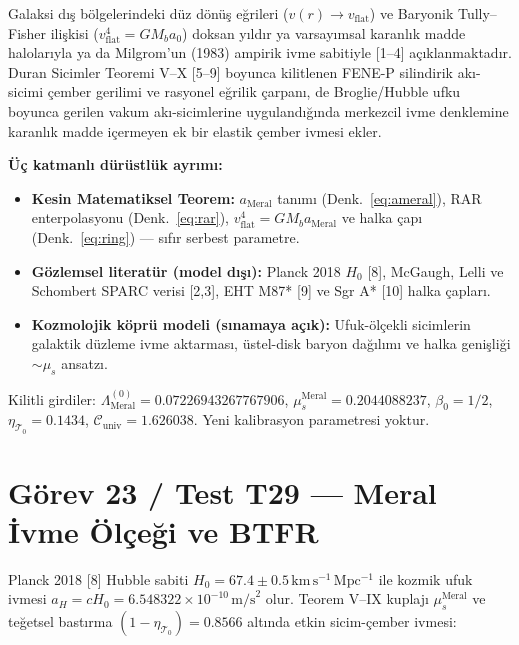 \documentclass[12pt,a4paper]{article}
\begin{document}
Galaksi dış bölgelerindeki düz dönüş eğrileri ($v(r)\to v_{\mathrm{flat}}$) ve
Baryonik Tully--Fisher ilişkisi ($v_{\mathrm{flat}}^4 = GM_b a_0$) doksan yıldır
ya varsayımsal karanlık madde halolarıyla ya da Milgrom'un (1983) ampirik ivme
sabitiyle [1--4] açıklanmaktadır. Duran Sicimler Teoremi V--X [5--9] boyunca
kilitlenen FENE-P silindirik akı-sicimi çember gerilimi ve rasyonel eğrilik
çarpanı, de Broglie/Hubble ufku boyunca gerilen vakum akı-sicimlerine
uygulandığında merkezcil ivme denklemine karanlık madde içermeyen ek bir elastik
çember ivmesi ekler.

\textbf{Üç katmanlı dürüstlük ayrımı:}
\begin{itemize}
    \item \textbf{Kesin Matematiksel Teorem:} $a_{\mathrm{Meral}}$ tanımı
    (Denk.~\ref{eq:ameral}), RAR enterpolasyonu (Denk.~\ref{eq:rar}),
    $v_{\mathrm{flat}}^4 = GM_b a_{\mathrm{Meral}}$ ve halka çapı
    (Denk.~\ref{eq:ring}) --- sıfır serbest parametre.
    \item \textbf{Gözlemsel literatür (model dışı):} Planck 2018 $H_0$ [8],
    McGaugh, Lelli ve Schombert SPARC verisi [2,3],
    EHT M87* [9] ve Sgr A* [10] halka çapları.
    \item \textbf{Kozmolojik köprü modeli (sınamaya açık):} Ufuk-ölçekli
    sicimlerin galaktik düzleme ivme aktarması, üstel-disk baryon dağılımı ve
    halka genişliği $\sim \mu_s$ ansatzı.
\end{itemize}
Kilitli girdiler: $\Lambda_{\mathrm{Meral}}^{(0)} = 0.07226943267767906$,
$\mu_s^{\mathrm{Meral}} = 0.2044088237$, $\beta_0 = 1/2$,
$\eta_{\mathcal{T}_0} = 0.1434$,
$\mathcal{C}_{\mathrm{univ}} = 1.626038$. Yeni kalibrasyon parametresi yoktur.

\section{Görev 23 / Test T29 --- Meral İvme Ölçeği ve BTFR}

Planck 2018 [8] Hubble sabiti $H_0 = 67.4\pm 0.5\,\mathrm{km\,s^{-1}\,Mpc^{-1}}$
ile kozmik ufuk ivmesi $a_H = cH_0 = 6.548322\times 10^{-10}\,\mathrm{m/s}^2$ olur.
Teorem V--IX kuplajı $\mu_s^{\mathrm{Meral}}$ ve teğetsel bastırma
$(1-\eta_{\mathcal{T}_0}) = 0.8566$ altında etkin sicim-çember ivmesi:
\end{document}

